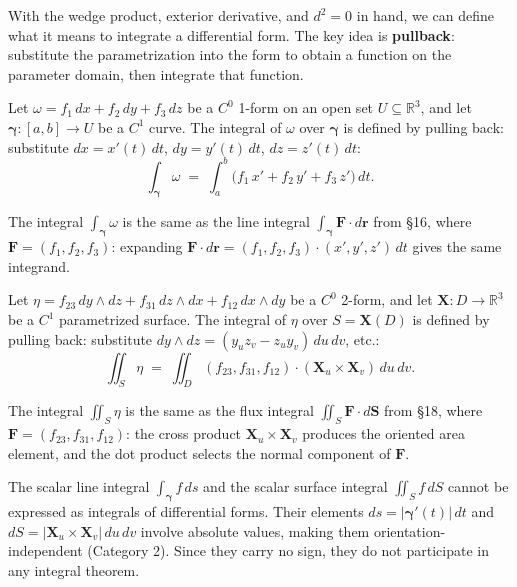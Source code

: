\documentclass[11pt]{report}
\newcommand{\R}{\mathbb{R}}
\begin{document}
With the wedge product, exterior derivative, and $d^2 = 0$ in hand, we can define what it means to integrate a differential form. The key idea is \textbf{pullback}: substitute the parametrization into the form to obtain a function on the parameter domain, then integrate that function.

\begin{definition}
Let $\omega = f_1\,dx + f_2\,dy + f_3\,dz$ be a $C^0$ 1-form on an open set $U \subseteq \R^3$, and let $\boldsymbol{\gamma}: [a,b] \to U$ be a $C^1$ curve. The integral of $\omega$ over $\boldsymbol{\gamma}$ is defined by pulling back: substitute $dx = x'(t)\,dt$, $dy = y'(t)\,dt$, $dz = z'(t)\,dt$:
\[
\int_{\boldsymbol{\gamma}} \omega \;=\; \int_a^b \big(f_1\,x' + f_2\,y' + f_3\,z'\big)\,dt.
\]
\end{definition}

\begin{remark}
The integral $\int_{\boldsymbol{\gamma}} \omega$ is the same as the line integral $\int_{\boldsymbol{\gamma}} \mathbf{F} \cdot d\mathbf{r}$ from \S16, where $\mathbf{F} = (f_1, f_2, f_3)$: expanding $\mathbf{F} \cdot d\mathbf{r} = (f_1, f_2, f_3) \cdot (x', y', z')\,dt$ gives the same integrand.
\end{remark}

\begin{definition}
Let $\eta = f_{23}\,dy \wedge dz + f_{31}\,dz \wedge dx + f_{12}\,dx \wedge dy$ be a $C^0$ 2-form, and let $\mathbf{X}: D \to \R^3$ be a $C^1$ parametrized surface. The integral of $\eta$ over $S = \mathbf{X}(D)$ is defined by pulling back: substitute $dy \wedge dz = (y_u z_v - z_u y_v)\,du\,dv$, etc.:
\[
\iint_S \eta \;=\; \iint_D (f_{23}, f_{31}, f_{12}) \cdot (\mathbf{X}_u \times \mathbf{X}_v)\,du\,dv.
\]
\end{definition}

\begin{remark}
The integral $\iint_S \eta$ is the same as the flux integral $\iint_S \mathbf{F} \cdot d\mathbf{S}$ from \S18, where $\mathbf{F} = (f_{23}, f_{31}, f_{12})$: the cross product $\mathbf{X}_u \times \mathbf{X}_v$ produces the oriented area element, and the dot product selects the normal component of $\mathbf{F}$.
\end{remark}

\begin{remark}
The scalar line integral $\int_{\boldsymbol{\gamma}} f\,ds$ and the scalar surface integral $\iint_S f\,dS$ cannot be expressed as integrals of differential forms. Their elements $ds = |\boldsymbol{\gamma}'(t)|\,dt$ and $dS = |\mathbf{X}_u \times \mathbf{X}_v|\,du\,dv$ involve absolute values, making them orientation-independent (Category 2). Since they carry no sign, they do not participate in any integral theorem.
\end{remark}
\end{document}
